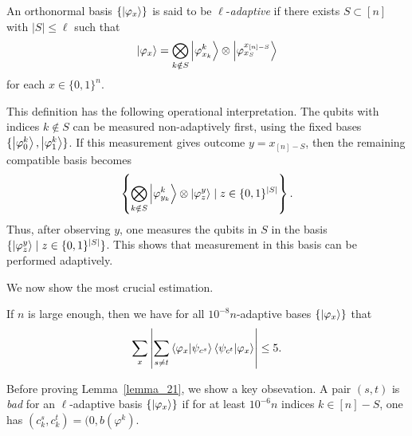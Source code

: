 \begin{definition}
An orthonormal basis $\{\ket{\varphi_x}\}$ is said to be $\ell$-\textit{adaptive} if there exists $S\subset[n]$ with $|S|\le\ell$ such that
\begin{align*}
\ket{\varphi_x}=\bigotimes_{k\notin S}\ket{\varphi^k_{x_k}}\otimes\ket{\varphi^{x_{[n]-S}}_{x_S}}
\end{align*}
for each $x\in\{0,1\}^n$.
\end{definition}
This definition has the following operational interpretation.
The qubits with indices $k\notin S$ can be measured non-adaptively first, using the fixed bases $\{\ket{\varphi^k_0},\ket{\varphi^k_1}\}$.
If this measurement gives outcome $y=x_{[n]-S}$, then the remaining compatible basis becomes
\begin{align*}
\left\{\bigotimes_{k\notin S}\ket{\varphi^k_{y_k}}\otimes\ket{\varphi^y_z}\mid z\in\{0,1\}^{|S|}\right\}.
\end{align*}
Thus, after observing $y$, one measures the qubits in $S$ in the basis $\{\ket{\varphi^y_z}\mid z\in\{0,1\}^{|S|}\}$.
This shows that measurement in this basis can be performed adaptively.

We now show the most crucial estimation.
\begin{lemma}\label{lemma_21}
If $n$ is large enough, then we have for all $10^{-8}n$-adaptive bases $\{\ket{\varphi_x}\}$ that
\begin{align*}
\sum_{x}\left|\sum_{s\neq t}\bra{\varphi_x}\ket{\psi_{c^s}}\bra{\psi_{c^t}}\ket{\varphi_{x}}\right|\le5.
\end{align*}
\end{lemma}
Before proving Lemma~\ref{lemma_21}, we show a key obsevation.
A pair $(s,t)$ is \textit{bad} for an $\ell$-adaptive basis $\{\ket{\varphi_x}\}$ if for at least $10^{-6}n$ indices $k\in[n]-S$, one has $(c^s_k,c^t_k)=(0,b(\varphi^k)$.


